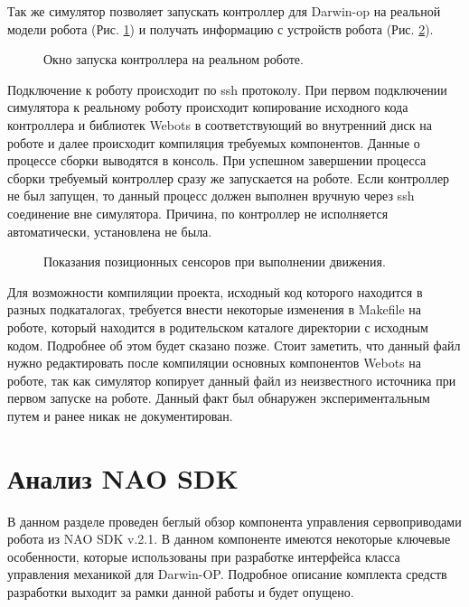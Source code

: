 Так же симулятор позволяет запускать контроллер для Darwin-op на реальной модели робота (Рис. \ref{im:1_webots_transfer}) и получать информацию с устройств робота (Рис. \ref{im:1_webots_position_sensors}).

\begin{figure}[h]
\caption{Окно запуска контроллера на реальном роботе.}
\label{im:1_webots_transfer}
\end{figure}

Подключение к роботу происходит по ssh протоколу. При первом подключении симулятора к реальному роботу происходит копирование исходного кода контроллера и библиотек Webots в соответствующий во внутренний диск на роботе и далее происходит компиляция требуемых компонентов. Данные о процессе сборки выводятся в консоль. При успешном завершении процесса сборки требуемый контроллер сразу же запускается на роботе. Если контроллер не был запущен, то данный процесс должен выполнен вручную через ssh соединение вне симулятора. Причина, по контроллер не исполняется автоматически, установлена не была.

\begin{figure}[h]
\caption{Показания позиционных сенсоров при выполнении движения.}
\label{im:1_webots_position_sensors}
\end{figure}

Для возможности компиляции проекта, исходный код которого находится в разных подкаталогах, требуется внести некоторые изменения в Makefile на роботе, который находится в родительском каталоге директории с исходным кодом. Подробнее об этом будет сказано позже. Стоит заметить, что данный файл нужно редактировать после компиляции основных компонентов Webots на роботе, так как симулятор копирует данный файл из неизвестного источника при первом запуске на роботе. Данный факт был обнаружен экспериментальным путем и ранее никак не документирован.

\section{Анализ NAO SDK}

В данном разделе проведен беглый обзор компонента управления сервоприводами робота из NAO SDK v.2.1. В данном компоненте имеются некоторые ключевые особенности, которые использованы при разработке интерфейса класса управления механикой для Darwin-OP. Подробное описание комплекта средств разработки выходит за рамки данной работы и будет опущено.

